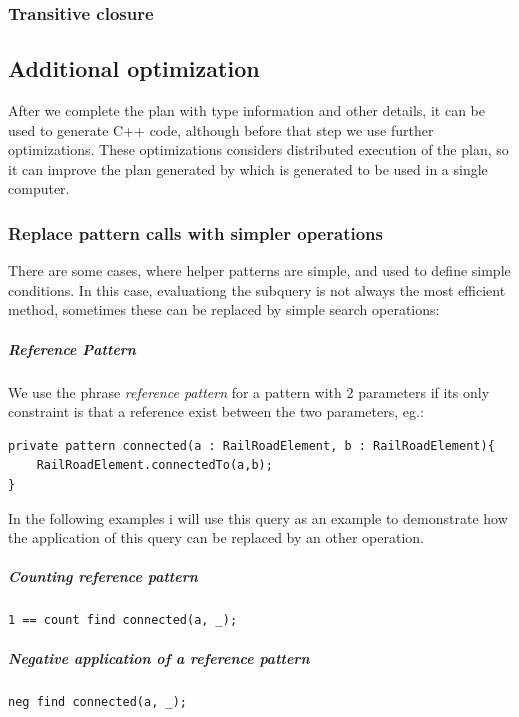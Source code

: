 \subsubsection{Transitive closure}





\subsection{Additional optimization}

After we complete the plan with type information and other details, it can be used to generate C++ code, although before that step we use further optimizations. 
These optimizations considers distributed execution of the plan, so it can improve the plan generated by \viatra{} which is generated to be used in a single computer.


\subsubsection{Replace pattern calls with simpler operations}
There are some cases, where helper patterns are simple, and used to define simple conditions. 
In this case, evaluationg the subquery is not always the most efficient method, sometimes these can be replaced by simple search operations:

\subparagraph{Reference Pattern}
We use the phrase \emph{reference pattern} for a pattern with 2 parameters if its only constraint is that a reference exist between the two parameters, eg.:
\begin{lstlisting}[language = vql]
private pattern connected(a : RailRoadElement, b : RailRoadElement){
	RailRoadElement.connectedTo(a,b);
}
\end{lstlisting}

In the following examples i will use this query as an example to demonstrate how the application of this query can be replaced by an other operation.

\subparagraph{Counting reference pattern} 

\begin{lstlisting}[language = vql]
1 == count find connected(a, _);
\end{lstlisting}


\subparagraph{Negative application of a reference pattern}

\begin{lstlisting}[language = vql]
neg find connected(a, _);
\end{lstlisting}

